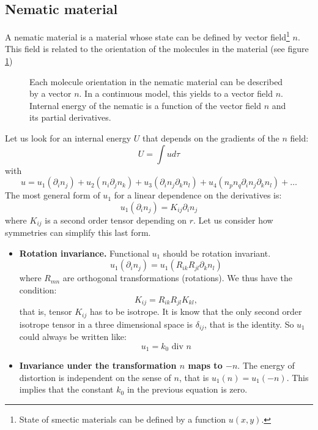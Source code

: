 \documentclass[12pt]{book}
\begin{document}
\subsection{Nematic material}\label{secenernema}
A nematic material is a material
\cite{ph:liqcr:DeGennes74} whose state can be defined by vector
field\footnote{%
State of smectic materials can be defined by a function
$u(x,y)$.%
}  $n$. This field is related to the orientation of the molecules in the
material (see figure
\ref{figchampnema})
\begin{figure}[htb]
 \centerline{}   
 \caption{Each molecule orientation in the nematic material can be described
   by a vector $n$. In a continuous model, this yields to a vector field
   $n$. Internal energy of the nematic is a function of the vector field $n$
   and its partial derivatives.}
 \label{figchampnema}
\end{figure}
Let us look for an internal energy $U$ that depends on the gradients of the $n$
field:
\begin{equation}
U=\int u d\tau
\end{equation}
with
\begin{equation}
u=u_1(\partial_in_j)+u_2(n_i\partial_jn_k)+ u_3(\partial_i
n_j\partial_kn_l)+ u_4(n_pn_q\partial_i n_j\partial_kn_l)+\dots
\end{equation}
The most general form of $u_1$ for a linear dependence on the derivatives is:
\begin{equation}\label{eqsansder}
u_1(\partial_in_j)= K_{ij} \partial_i n_j
\end{equation}
where $K_{ij}$ is a second order tensor depending on $r$.
Let us consider how symmetries can simplify this last form.
\begin{itemize}
\item {\bf Rotation invariance.}
Functional $u_1$ should be rotation invariant.
\begin{equation}
u_1(\partial_i n_j)=u_1(R_{ik}R_{jl}\partial_k n_l)
\end{equation}
where $R_{mn}$ are orthogonal transformations (rotations). We thus have the
condition: 
\begin{equation}
K_{ij}=R_{ik}R_{jl}K_{kl},
\end{equation}
that is, tensor $K_{ij}$ has to be isotrope. It is know that the only second
order isotrope tensor in a three dimensional space is $\delta_{ij}$, that is
the identity. So $u_1$ could always be written like:
\begin{equation}
u_1=k_0\mbox{ div } n
\end{equation}
\item {\bf Invariance under the transformation $n$ maps to $-n$}. The energy
  of distortion is independent on the sense of $n$, that is
  $u_1(n)=u_1(-n)$. This implies that the constant $k_0$ in the previous
  equation is zero. 
\end{itemize}
\end{document}
